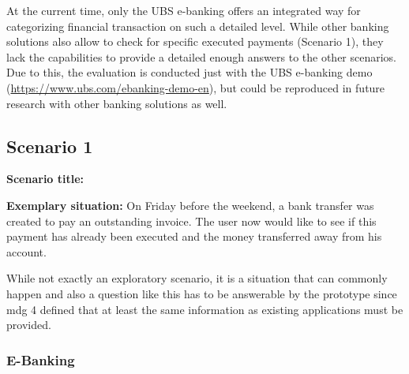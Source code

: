 At the current time, only the UBS e-banking offers an integrated way for categorizing financial transaction on such a detailed level. While other banking solutions also allow to check for specific executed payments (Scenario 1), they lack the capabilities to provide a detailed enough answers to the other scenarios. Due to this, the evaluation is conducted just with the UBS e-banking demo (\url{https://www.ubs.com/ebanking-demo-en}), but could be reproduced in future research with other banking solutions as well.


\subsection{Scenario 1}

\textbf{Scenario title:} \scenone

\textbf{Exemplary situation:} On Friday before the weekend, a bank transfer was created to pay an outstanding invoice. The user now would like to see if this payment has already been executed and the money transferred away from his account. 

While not exactly an exploratory scenario, it is a situation that can commonly happen and also a question like this has to be answerable by the prototype since \gls{mdg} 4 defined that at least the same information as existing applications must be provided.


\subsubsection{E-Banking}

